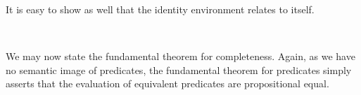 \documentclass[authoryear, acmsmall, screen, review, nonacm]{acmart}
\begin{document}
It is easy to show as well that the identity environment relates to itself.

\begin{code}%
\>[0]\AgdaSpace{}%
\AgdaSymbol{:}\AgdaSpace{}%
\AgdaSpace{}%
\AgdaSymbol{\{}\AgdaSymbol{\}}\AgdaSpace{}%
\AgdaSpace{}%
\AgdaSpace{}%
\AgdaSymbol{(}\AgdaSpace{}%
\AgdaSymbol{\{}\AgdaSymbol{\})}\AgdaSpace{}%
\AgdaSymbol{(}\AgdaSpace{}%
\AgdaSymbol{\{}\AgdaSymbol{\})}\<%
\\
\>[0]\AgdaSpace{}%
\AgdaSpace{}%
\AgdaSymbol{=}\AgdaSpace{}%
\AgdaSpace{}%
\<%
\end{code}

We may now state the fundamental theorem for completeness. Again, as we have no semantic image of predicates, the fundamental theorem for predicates simply asserts that the evaluation of equivalent predicates are propositional equal.
\end{document}
